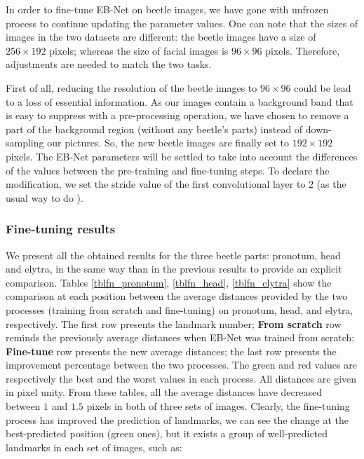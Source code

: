 \documentclass[review]{elsarticle}
\begin{document}
In order to fine-tune EB-Net on beetle images, we have gone with unfrozen process to continue updating the parameter values. One can note that the sizes of images in the two datasets are different: the beetle images have a size of $256 \times 192$ pixels; whereas the size of facial images is $96 \times 96$ pixels. Therefore, adjustments are needed to match the two tasks.

First of all, reducing the resolution of the beetle images to $96 \times 96$ could be lead to a loss of essential information. As our images contain a background band that is easy to suppress with a pre-processing operation, we have chosen to remove a part of the background region (without any beetle's parts) instead of down-sampling our pictures. So, the new beetle images are finally set to $192 \times 192$ pixels. The EB-Net parameters will be settled to take into account the differences of the values between the pre-training and fine-tuning steps. To declare the modification, we set the stride value of the first convolutional layer to $2$ (as the usual way to do \cite{yosinski2014transferable}). 
\subsubsection{Fine-tuning results}
We present all the obtained results for the three beetle parts: pronotum, head and elytra, in the same way than in the previous results to provide an explicit comparison. Tables \ref{tblfn_pronotum}, \ref{tblfn_head}, \ref{tblfn_elytra} show the comparison at each position between the average distances provided by the two processes (training from scratch and fine-tuning) on pronotum, head, and elytra, respectively.  The first row presents the landmark number; \textbf{From scratch} row reminds the previously average distances when EB-Net was trained from scratch; \textbf{Fine-tune} row presents the new average distances; the last row presents the improvement percentage between the two processes. The green and red values are respectively the best and the worst values in each process. All distances are given in pixel unity. From these tables, all the average distances have decreased between $1$ and $1.5$ pixels in both of three sets of images. Clearly, the fine-tuning process has improved the prediction of landmarks, we can see the change at the best-predicted position (green ones), but it exists a group of well-predicted landmarks in each set of images, such as:
\end{document}
